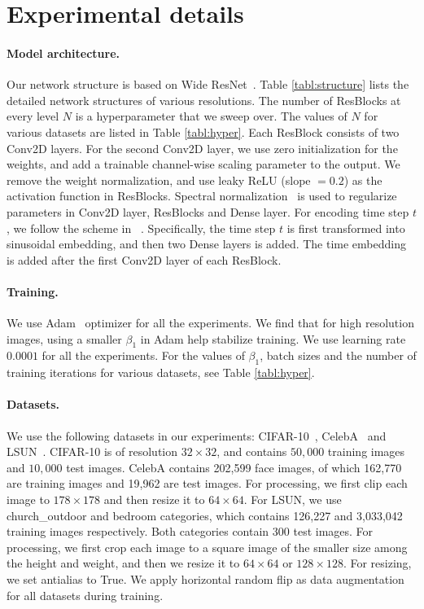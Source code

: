 \documentclass{article} \usepackage{iclr2021_conference,times}
\begin{document}
\section{Experimental details} \label{app:exp}
\paragraph{Model architecture.} Our network structure is based on Wide ResNet~\citep{zagoruyko2016wide}. Table \ref{tabl:structure} lists the detailed network structures of various resolutions. The number of ResBlocks at every level $N$ is a hyperparameter that we sweep over. The values of $N$ for various datasets are listed in Table \ref{tabl:hyper}. Each ResBlock consists of two Conv2D layers. For the second Conv2D layer, we use zero initialization for the weights, and add a trainable channel-wise scaling parameter to the output. We remove the weight normalization, and use leaky ReLU (slope $= 0.2$) as the activation function in ResBlocks. Spectral normalization~\citep{miyato2018spectral} is used to regularize parameters in Conv2D layer, ResBlocks and Dense layer. For encoding time step $t$, we follow the scheme in ~\citep{ho2020denoising}. Specifically, the time step $t$ is first transformed into sinusoidal embedding, and then two Dense layers is added. The time embedding is added after the first Conv2D layer of each ResBlock. 

\paragraph{Training.} We use Adam~\citep{kingma2014adam} optimizer for all the experiments. We find that for high resolution images, using a smaller $\beta_1$ in Adam help stabilize training. We use learning rate $0.0001$ for all the experiments. For the values of $\beta_1$, batch sizes and the number of training iterations for various datasets, see Table \ref{tabl:hyper}. 

\paragraph{Datasets.} We use the following datasets in our experiments: CIFAR-10~\citep{krizhevsky2009learning}, CelebA~\citep{liu2015faceattributes} and LSUN~\citep{yu2015lsun}. CIFAR-10 is of resolution $32 \times 32$, and contains $50,000$ training images and $10,000$ test images. CelebA contains 202,599 face images, of which 162,770 are training images and 19,962 are test images. For processing, we first clip each image to $178 \times 178$ and then resize it to $64 \times 64$. For LSUN, we use church\_outdoor and bedroom categories, which contains 126,227 and 3,033,042 training images respectively. Both categories contain $300$ test images. For processing, we first crop each image to a square image of the smaller size among the height and weight, and then we resize it to $64 \times 64$ or $128 \times 128$. For resizing, we set antialias to True. We apply horizontal random flip as data augmentation for all datasets during training. 
\end{document}
